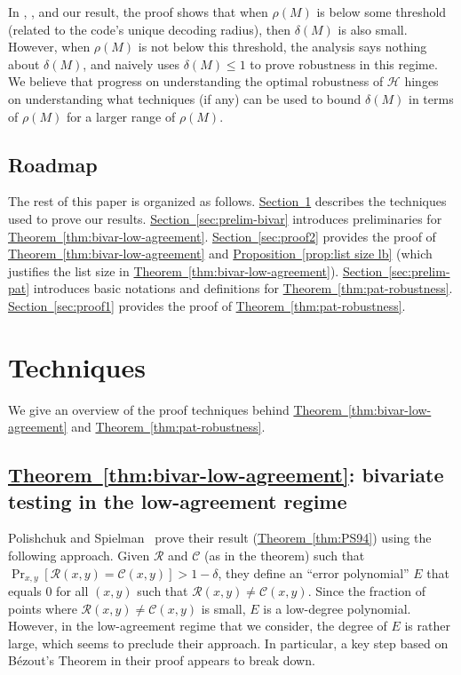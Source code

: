 \documentclass[11pt]{article}
\numberwithin{equation}{section}
\theoremstyle{definition}
\theoremstyle{plain}
\newcommand{\expref}[2]{\hyperref[#2]{#1~\ref{#2}}}
\theoremstyle{plain}
\newcommand{\colored}{}
\newcommand{\reldist}{\colored{\delta}}
\newcommand{\robust}{\colored{\rho}} %
\newcommand{\tester}{\colored{\mathcal H}} %
\newcommand{\testerinput}{\colored{M}} %
\newcommand{\rowpoly}{\colored{\mathcal R}}
\newcommand{\colpoly}{\colored{\mathcal C}}
\newcommand{\prox}{\colored{\delta}}
\begin{document}
In \cite{Ben-SassonS06}, \cite{Viderman12}, and our result, the proof shows that when $\robust(\testerinput)$ is below some threshold (related to the code's unique decoding radius), then $\reldist(\testerinput)$ is also small. However, when $\robust(\testerinput)$ is not below this threshold, the analysis says nothing about $\reldist(\testerinput)$, and naively uses $\reldist(\testerinput) \leq 1$ to prove robustness in this regime. We believe that progress on understanding the optimal robustness of $\tester$ hinges on understanding what techniques (if any) can be used to bound $\reldist(\testerinput)$ in terms of $\robust(\testerinput)$ for a larger range of $\robust(\testerinput)$.

%
%
%
\subsection{Roadmap}
\label{sec:roadmap}

The rest of this paper is organized as follows.
\expref{Section}{sec:techniques} describes the techniques used to prove our results.
\expref{Section}{sec:prelim-bivar} introduces preliminaries for \expref{Theorem}{thm:bivar-low-agreement}.
\expref{Section}{sec:proof2} provides the proof of \expref{Theorem}{thm:bivar-low-agreement} and  \expref{Proposition}{prop:list size lb} (which justifies the list size in \expref{Theorem}{thm:bivar-low-agreement}).
\expref{Section}{sec:prelim-pat} introduces basic notations and definitions for \expref{Theorem}{thm:pat-robustness}.
\expref{Section}{sec:proof1} provides the proof of \expref{Theorem}{thm:pat-robustness}.



%
%
%
\section{Techniques}
\label{sec:techniques}

We give an overview of the proof techniques behind  \expref{Theorem}{thm:bivar-low-agreement} and \expref{Theorem}{thm:pat-robustness}.

%
%
%
\subsection{\expref{Theorem}{thm:bivar-low-agreement}: bivariate testing in the low-agreement regime}       %
\label{sec:techniques-2}

Polishchuk and Spielman~\cite{PolishchukS94} prove their result (\expref{Theorem}{thm:PS94}) using the following approach. Given $\rowpoly$ and $\colpoly$ (as in the theorem) such that $\Pr_{x,y}[\rowpoly(x,y) = \colpoly(x,y)] > 1 - \prox$, they define an ``error polynomial'' $E$ that equals 0 for all $(x,y)$ such that $\rowpoly(x,y) \neq \colpoly(x,y)$. Since the fraction of points where $\rowpoly(x,y) \neq \colpoly(x,y)$ is small, $E$ is a low-degree polynomial. However, in the low-agreement regime that we consider, the degree of $E$ is rather large, which seems to preclude their approach. In particular, a key step based on B\'{e}zout's Theorem in their proof appears to break down.
\end{document}
